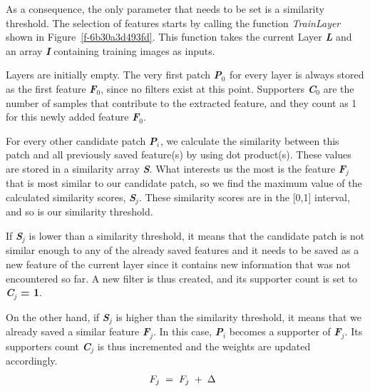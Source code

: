 \documentclass[3p,,preprint,review,12pt]{elsarticle}
\begin{document}
As a consequence, the only parameter that needs to be set is a similarity threshold. The selection of features starts by calling the function \textit{TrainLayer} shown in Figure~\ref{f-6b30a3d493fd}. This function takes the current Layer \textbf{\textit{L}} and an array \textbf{\textit{I}} containing training images as inputs.

Layers are initially empty. The very first patch \textbf{\textit{P}}\textit{\textbf{\ensuremath{_{0}}}}\ensuremath{_{}} for every layer is always stored as the first feature \textbf{\textit{F}}\textit{\textbf{\ensuremath{_{0}}}}, since no filters exist at this point. Supporters \textbf{\textit{C}}\textit{\textbf{\ensuremath{_{0}}}} are the number of samples that contribute to the extracted feature, and they count as 1 for this newly added feature \textbf{\textit{F}}\textit{\textbf{\ensuremath{_{0}}}}.

For every other candidate patch \textbf{\textit{P}}\textit{\textbf{\ensuremath{_{i}}}}\ensuremath{_{}}, we calculate the similarity between this patch and all previously saved feature(s) by using dot product(s). These values are stored in a similarity array \textbf{\textit{S}}. What interests us the most is the feature \textbf{\textit{F}}\textit{\textbf{\ensuremath{_{j}}}} that is most similar to our candidate patch, so we find the maximum value of the calculated similarity scores, \textbf{\textit{S}}\textit{\textbf{\ensuremath{_{j}}}}. These similarity scores are in the [0,1] interval, and so is our similarity threshold. 

If \textbf{\textit{S}}\textit{\textbf{\ensuremath{_{j}}}} is lower than a similarity threshold, it means that the candidate patch is not similar enough to any of the already saved features and it needs to be saved as a new feature of the current layer since it contains new information that was not encountered so far. A new filter is thus created, and its supporter count is set to \textbf{\textit{C}}\textit{\textbf{\ensuremath{_{j}}}} \textbf{= 1}.

On the other hand, if \textbf{\textit{S}}\textit{\textbf{\ensuremath{_{j}}}} is higher than the similarity threshold, it means that we already saved a similar feature \textbf{\textit{F}}\textit{\textbf{\ensuremath{_{j}}}}. In this case, \textbf{\textit{P}}\textit{\textbf{\ensuremath{_{i}}}} becomes a supporter of \textbf{\textit{F}}\textit{\textbf{\ensuremath{_{j}}}}. Its supporters count \textbf{\textit{C}}\textit{\textbf{\ensuremath{_{j}}}} is thus incremented and the weights are updated accordingly.
\let\saveeqnno\theequation
\let\savefrac\frac
\def\dispfrac{\displaystyle\savefrac}
\begin{eqnarray}
\let\frac\dispfrac
\gdef\theequation{6}
\let\theHequation\theequation
\label{dfg-cb6d8d42480c}
\begin{array}{@{}l}F_j\;=\;F_j\;+\;\Delta\end{array}
\end{eqnarray}
\global\let\theequation\saveeqnno
\addtocounter{equation}{-1}\ignorespaces 
\end{document}

